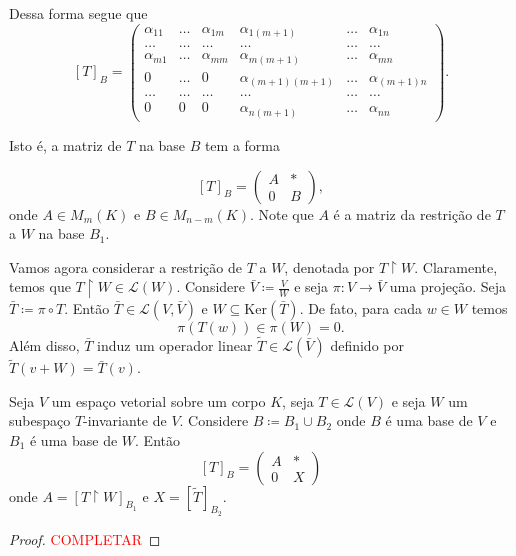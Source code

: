 \documentclass[11pt,twoside,a4paper]{book}
\begin{document}
Dessa forma segue que
\[[T]_B=\begin{pmatrix}
    \alpha_{11} & \ldots & \alpha_{1m} &\alpha_{1(m+1)}& \ldots & \alpha_{1n}
    \\ \ldots & \ldots & \ldots & \ldots &\ldots & \ldots
    \\\alpha_{m1} & \ldots & \alpha_{mm} & \alpha_{m(m+1)} & \ldots &
    \alpha_{mn}\\ 0 & \ldots & 0 & \alpha_{(m+1)(m+1)}&\ldots &\alpha_{(m+1)n}\\
    \ldots & \ldots & \ldots & \ldots &\ldots & \ldots \\ 0 & 0 & 0
    &\alpha_{n(m+1)} & \ldots & \alpha_{nn}
\end{pmatrix}.\]

Isto é, a matriz de \(T\) na base \(B\) tem a forma

\[[T]_B=\begin{pmatrix}
    A & * \\ 0 & B\end{pmatrix},\]
onde \(A\in M_m(K)\) e \(B\in M_{n-m}(K)\). Note que \(A\) é a matriz da
restrição de \(T\) a \(W\) na base \(B_1\).

Vamos agora considerar a restrição de \(T\) a \(W\), denotada por
\(T\upharpoonright W\). Claramente, temos que \(T\upharpoonright
W\in\mathcal{L}(W)\). Considere \(\bar{V}\coloneqq\frac{V}{W}\) e seja 
\(\pi\colon V\to\bar{V}\) uma projeção. Seja \(\bar{T}\coloneqq \pi\circ T\).
Então \(\bar{T}\in\mathcal{L}(V,\bar{V})\) e \(W\subseteq\text{Ker}(\bar{T})\).
De fato, para cada \(w\in W\) temos \[\pi(T(w))\in \pi(W)=0.\]
Além disso, \(\bar{T}\) induz um operador linear
\(\tilde{T}\in\mathcal{L}(\bar{V})\) definido por \(\tilde{T}(v+W)=\bar{T}(v)\).

\begin{proposicao}
Seja \(V\) um espaço vetorial sobre um corpo \(K\), seja \(T\in\mathcal{L}(V)\)
e seja \(W\) um subespaço \(T\)-invariante de \(V\). Considere \(B\coloneqq
B_1\cup B_2\) onde \(B\) é uma base de \(V\) e \(B_1\) é uma base de \(W\).
Então \[[T]_B=\begin{pmatrix}
    A & * \\ 0 & X 
  \end{pmatrix}\]
onde \(A=[T\upharpoonright W]_{B_1}\) e \(X=[\tilde{T}]_{B_2}\).
\end{proposicao}
\begin{proof}
\textcolor{red}{COMPLETAR}
\end{proof}
\end{document}
